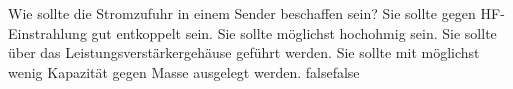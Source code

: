     {Wie sollte die Stromzufuhr in einem Sender beschaffen sein?}
    {Sie sollte gegen HF-Einstrahlung gut entkoppelt sein.}
    {Sie sollte möglichst hochohmig sein.}
    {Sie sollte über das Leistungsverstärkergehäuse geführt werden.}
    {Sie sollte mit möglichst wenig Kapazität gegen Masse ausgelegt werden. }
    {false}{false}
